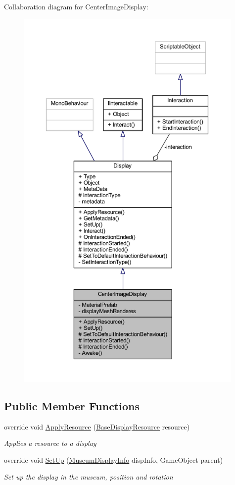 Collaboration diagram for Center\+Image\+Display\+:
\nopagebreak
\begin{figure}[H]
\begin{center}
\leavevmode
\includegraphics[height=550pt]{class_center_image_display__coll__graph}
\end{center}
\end{figure}
\subsection*{Public Member Functions}
\begin{DoxyCompactItemize}
\item 
override void \mbox{\hyperlink{class_center_image_display_a140b8b82522c1aedb473b3cd532dcd34}{Apply\+Resource}} (\mbox{\hyperlink{class_base_display_resource}{Base\+Display\+Resource}} resource)
\begin{DoxyCompactList}\small\item\em Applies a resource to a display \end{DoxyCompactList}\item 
override void \mbox{\hyperlink{class_center_image_display_a3da996020c7d8abcd24f35660945703a}{Set\+Up}} (\mbox{\hyperlink{class_museum_display_info}{Museum\+Display\+Info}} disp\+Info, Game\+Object parent)
\begin{DoxyCompactList}\small\item\em Set up the display in the museum, position and rotation \end{DoxyCompactList}\end{DoxyCompactItemize}

